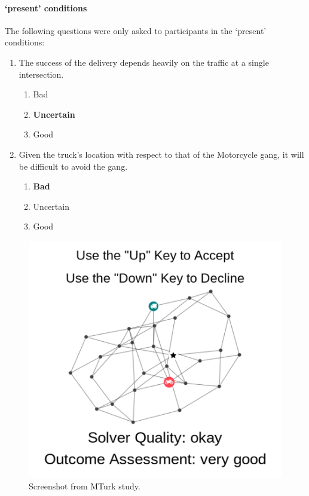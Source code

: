 \paragraph{\xO{} `present' conditions} The following questions were only asked to participants in the \xO{} `present' conditions:
\begin{quoting}
\begin{enumerate}
    \item The success of the delivery depends heavily on the traffic at a single intersection.
    \begin{enumerate}[label=(\alph*)]
        \item Bad
        \item \textbf{Uncertain}
        \item Good
    \end{enumerate}
    \item Given the truck’s location with respect to that of the Motorcycle gang, it will be difficult to avoid the gang.
    \begin{enumerate}[label=(\alph*)]
        \item \textbf{Bad}
        \item Uncertain
        \item Good
    \end{enumerate}
\end{enumerate}
\end{quoting}

\begin{figure}[tb]
    \centering
    \includegraphics[width=0.7\linewidth]{Figures/experiment_screenshot_Compressed.png}
    \caption{Screenshot from MTurk study.}
    \label{fig:screenshot}
\end{figure}

